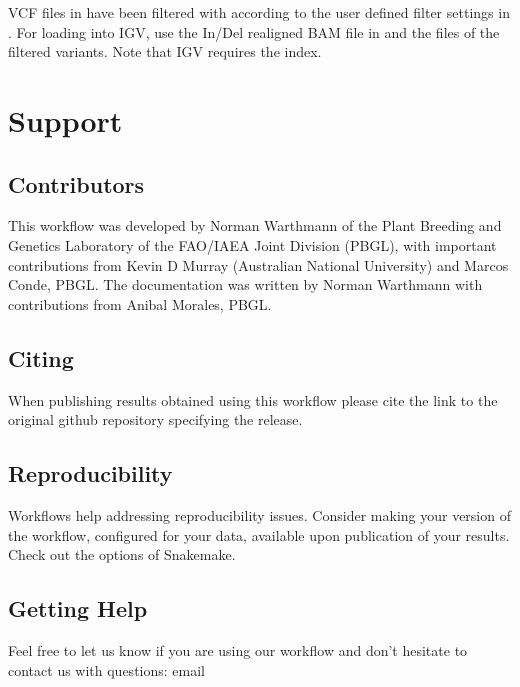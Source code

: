 \documentclass[letterpaper,10pt,english]{sphinxmanual}
\begin{document}
VCF files in  have been filtered with  according to the user defined filter settings in .
For loading into IGV, use the In/Del realigned BAM file in  and the  files of the filtered variants. Note that IGV requires the  index.


\chapter{Support}
\label{\detokenize{index:support}}

\section{Contributors}
\label{\detokenize{index:contributors}}
This workflow was developed by Norman Warthmann of the Plant Breeding and Genetics Laboratory of the FAO/IAEA Joint Division (PBGL), with important contributions from Kevin D Murray (Australian National University) and Marcos Conde, PBGL. The documentation was written by Norman Warthmann with contributions from Anibal Morales, PBGL.


\section{Citing}
\label{\detokenize{index:citing}}
When publishing results obtained using this workflow please cite the link to the original github repository specifying the release.


\section{Reproducibility}
\label{\detokenize{index:reproducibility}}
Workflows help addressing reproducibility issues. Consider making your version of the workflow, configured for your data, available upon publication of your results. Check out the  options of Snakemake.


\section{Getting Help}
\label{\detokenize{index:getting-help}}
Feel free to let us know if you are using our workflow and don’t hesitate to contact us with questions: email 



\renewcommand{\indexname}{Index}
\printindex
\end{document}
